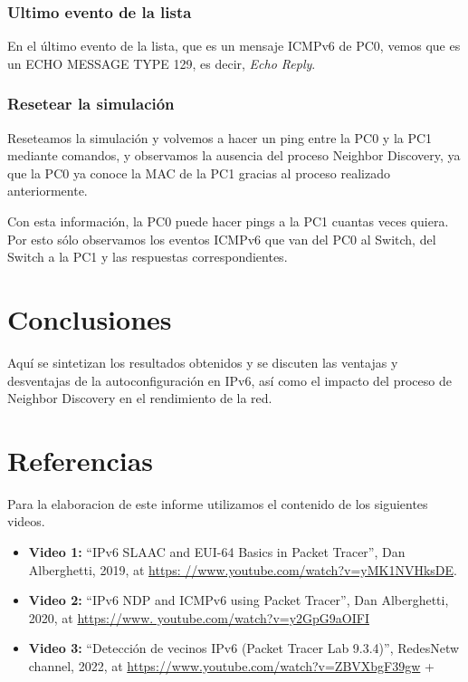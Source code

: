 \documentclass[a4paper,12pt]{article}
\begin{document}
\bigskip

\subsubsection{Ultimo evento de la lista}

En el último evento de la lista, que es un mensaje ICMPv6 de PC0, vemos que es un ECHO MESSAGE TYPE 129, es decir, \textit{Echo Reply}.

\bigskip

\subsubsection{Resetear la simulación}

Reseteamos la simulación y volvemos a hacer un ping entre la PC0 y la PC1 mediante comandos, y observamos la ausencia del proceso Neighbor Discovery, ya que la PC0 ya conoce la MAC de la PC1 gracias al proceso realizado anteriormente.

\bigskip


Con esta información, la PC0 puede hacer pings a la PC1 cuantas veces quiera. Por esto sólo observamos los eventos ICMPv6 que van del PC0 al Switch, del Switch a la PC1 y las respuestas correspondientes. 

\bigskip

\section{Conclusiones}
Aquí se sintetizan los resultados obtenidos y se discuten las ventajas y desventajas de la autoconfiguración en IPv6, así como el impacto del proceso de Neighbor Discovery en el rendimiento de la red.

\section{Referencias}
Para la elaboracion de este informe utilizamos el contenido de los siguientes videos. 
\begin{itemize}
  \item \textbf{Video 1:} “IPv6 SLAAC and EUI-64 Basics in Packet Tracer”, Dan Alberghetti, 2019, at \url{https:
  //www.youtube.com/watch?v=yMK1NVHksDE}.
  \item \textbf{Video 2:} “IPv6 NDP and ICMPv6 using Packet Tracer”, Dan Alberghetti, 2020, at \url{https://www.
  youtube.com/watch?v=y2GpG9aOIFI}
  \item \textbf{Video 3:} “Detección de vecinos IPv6 (Packet Tracer Lab 9.3.4)”, RedesNetw channel, 2022, at \url{https://www.youtube.com/watch?v=ZBVXbgF39gw}
+\end{itemize}
\end{document}
